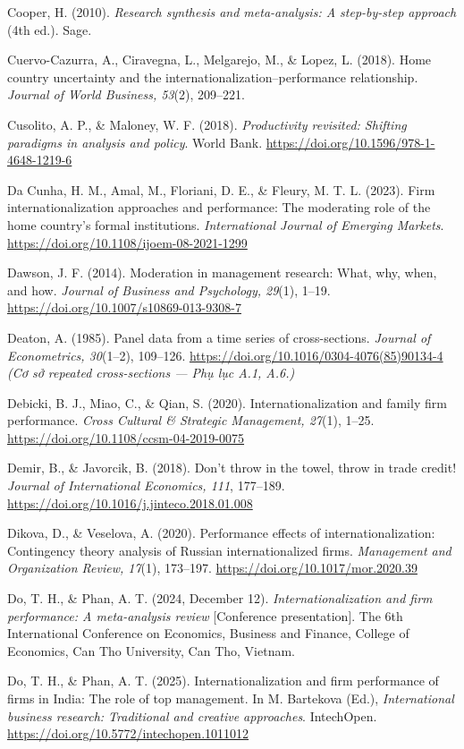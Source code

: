 \documentclass[
  a4paper,
  13pt]{extreport}
\begin{document}
Cooper, H. (2010). \emph{Research synthesis and meta-analysis: A
step-by-step approach} (4th ed.). Sage.

Cuervo-Cazurra, A., Ciravegna, L., Melgarejo, M., \& Lopez, L. (2018).
Home country uncertainty and the internationalization--performance
relationship. \emph{Journal of World Business, 53}(2), 209--221.

Cusolito, A. P., \& Maloney, W. F. (2018). \emph{Productivity revisited:
Shifting paradigms in analysis and policy}. World Bank.
\url{https://doi.org/10.1596/978-1-4648-1219-6}

Da Cunha, H. M., Amal, M., Floriani, D. E., \& Fleury, M. T. L. (2023).
Firm internationalization approaches and performance: The moderating
role of the home country's formal institutions. \emph{International
Journal of Emerging Markets}.
\url{https://doi.org/10.1108/ijoem-08-2021-1299}

Dawson, J. F. (2014). Moderation in management research: What, why,
when, and how. \emph{Journal of Business and Psychology, 29}(1), 1--19.
\url{https://doi.org/10.1007/s10869-013-9308-7}

Deaton, A. (1985). Panel data from a time series of cross-sections.
\emph{Journal of Econometrics, 30}(1--2), 109--126.
\url{https://doi.org/10.1016/0304-4076(85)90134-4} \emph{(Cơ sở repeated
cross-sections --- Phụ lục A.1, A.6.)}

Debicki, B. J., Miao, C., \& Qian, S. (2020). Internationalization and
family firm performance. \emph{Cross Cultural \& Strategic Management,
27}(1), 1--25. \url{https://doi.org/10.1108/ccsm-04-2019-0075}

Demir, B., \& Javorcik, B. (2018). Don't throw in the towel, throw in
trade credit! \emph{Journal of International Economics, 111}, 177--189.
\url{https://doi.org/10.1016/j.jinteco.2018.01.008}

Dikova, D., \& Veselova, A. (2020). Performance effects of
internationalization: Contingency theory analysis of Russian
internationalized firms. \emph{Management and Organization Review,
17}(1), 173--197. \url{https://doi.org/10.1017/mor.2020.39}

Do, T. H., \& Phan, A. T. (2024, December 12).
\emph{Internationalization and firm performance: A meta-analysis review}
{[}Conference presentation{]}. The 6th International Conference on
Economics, Business and Finance, College of Economics, Can Tho
University, Can Tho, Vietnam.

Do, T. H., \& Phan, A. T. (2025). Internationalization and firm
performance of firms in India: The role of top management. In M.
Bartekova (Ed.), \emph{International business research: Traditional and
creative approaches}. IntechOpen.
\url{https://doi.org/10.5772/intechopen.1011012}
\end{document}
